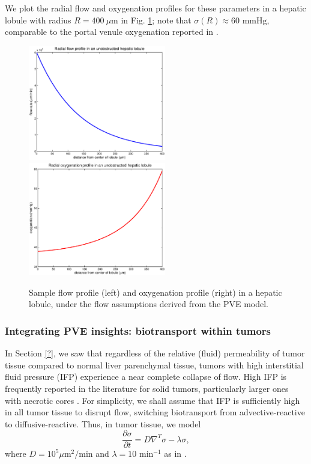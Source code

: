 \documentclass[smallextended,natbib]{svjour3}
\newcommand{\beq}{\begin{equation}}
\newcommand{\eeq}{\end{equation}}
\newcommand{\micron}{\mu\textrm{m}}
\begin{document}
We plot 
the radial flow and oxygenation profiles for these parameters in a hepatic lobule with 
radius $R = 400 \:\micron$ 
in Fig. \ref{fig:radial_flow_oxygenation}; note that $\sigma(R) \approx 60 \textrm{ mmHg}$, comparable to 
the portal venule oxygenation reported in \cite{tsukada}. 

\begin{figure}
\includegraphics[width=6cm]{./figures/flow.eps}
\includegraphics[width=6cm]{./figures/O2.eps}
\caption{Sample flow profile (left) and oxygenation profile (right) in a hepatic lobule, 
under the flow assumptions derived from the PVE model.}
\label{fig:radial_flow_oxygenation}
\end{figure}

\subsubsection{Integrating PVE insights: biotransport within tumors}
In Section \ref{?}, we saw that regardless of the relative (fluid) permeability 
of tumor tissue compared to normal liver parenchymal tissue, tumors with 
high interstitial fluid pressure (IFP) experience a near complete collapse of 
flow. High IFP is frequently reported in the literature for solid tumors, particularly larger ones with necrotic cores  
\cite{?}. 
For simplicity, we shall assume that IFP is sufficiently high in all tumor tissue to disrupt flow, switching biotransport from advective-reactive to diffusive-reactive.  Thus, in tumor tissue, we model 
\beq
\frac{\partial \sigma}{\partial t}  =  
D \nabla^T \sigma - \lambda \sigma, 
\eeq
where $D = 10^5 \micron^2/\textrm{min}$ and $\lambda = 10 \textrm{ min}^{-1}$ as 
in \cite{?}. 
\end{document}
